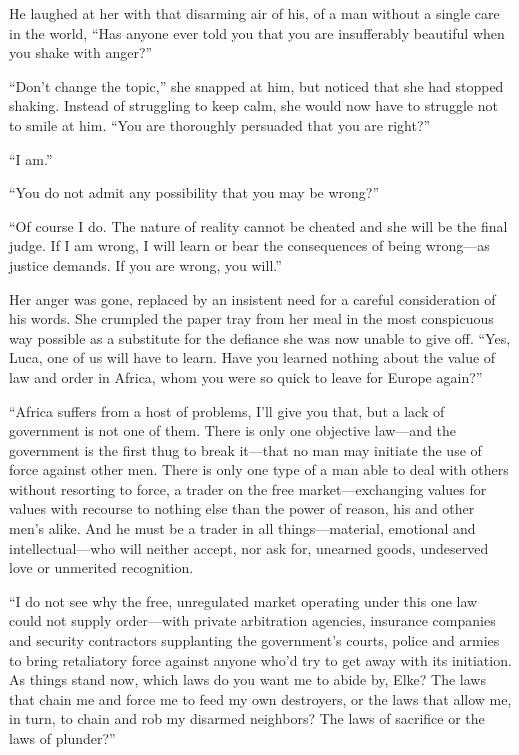 He laughed at her with that disarming air of his, of a man without a single care in the world, ``Has anyone ever told you that you are insufferably beautiful when you shake with anger?''

``Don't change the topic,'' she snapped at him, but noticed that she had stopped shaking. Instead of struggling to keep calm, she would now have to struggle not to smile at him. ``You are thoroughly persuaded that you are right?''

``I am.''

``You do not admit any possibility that you may be wrong?''

``Of course I do. The nature of reality cannot be cheated and she will be the final judge. If I am wrong, I will learn or bear the consequences of being wrong---as justice demands. If you are wrong, you will.''

Her anger was gone, replaced by an insistent need for a careful consideration of his words. She crumpled the paper tray from her meal in the most conspicuous way possible as a substitute for the defiance she was now unable to give off. ``Yes, Luca, one of us will have to learn. Have you learned nothing about the value of law and order in Africa, whom you were so quick to leave for Europe again?''

``Africa suffers from a host of problems, I'll give you that, but a lack of government is not one of them. There is only one objective law---and the government is the first thug to break it---that no man may initiate the use of force against other men. There is only one type of a man able to deal with others without resorting to force, a trader on the free market---exchanging values for values with recourse to nothing else than the power of reason, his and other men's alike. And he must be a trader in all things---material, emotional and intellectual---who will neither accept, nor ask for, unearned goods, undeserved love or unmerited recognition.

``I do not see why the free, unregulated market operating under this one law could not supply order---with private arbitration agencies, insurance companies and security contractors supplanting the government's courts, police and armies to bring retaliatory force against anyone who'd try to get away with its initiation. As things stand now, which laws do you want me to abide by, Elke? The laws that chain me and force me to feed my own destroyers, or the laws that allow me, in turn, to chain and rob my disarmed neighbors? The laws of sacrifice or the laws of plunder?''

